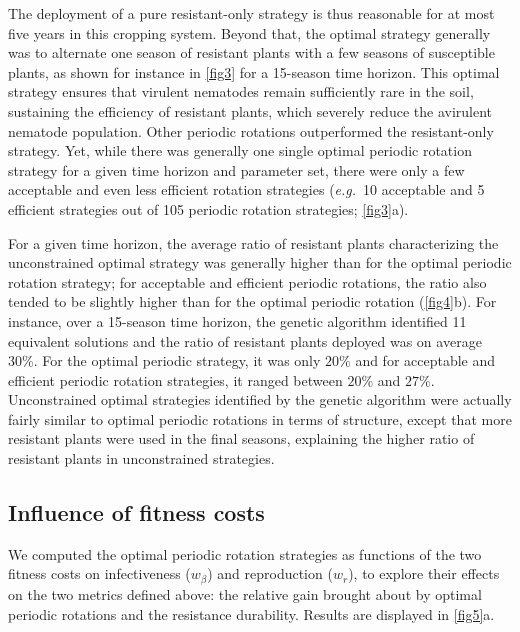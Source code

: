 {{{{The deployment of a pure resistant-only strategy is thus reasonable
for at most five years in this cropping system. Beyond that, the
optimal strategy generally was to alternate one season of resistant
plants with a few seasons of susceptible plants, as shown for instance
in \autoref{fig3} for a 15-season time horizon. This optimal strategy
ensures that virulent nematodes remain sufficiently rare in the soil,
{sustaining} the efficiency of resistant plants, which severely reduce
the avirulent nematode population. Other periodic rotations
outperformed the resistant-only strategy. Yet, while there was
generally one single optimal periodic rotation strategy for a given
time horizon and parameter set, there were only a few acceptable and
even less efficient rotation strategies (\textit{e.g.}~10 acceptable
and 5 efficient strategies out of 105 periodic rotation strategies;
\autoref{fig3}a).


For a given time horizon, the average ratio of resistant plants
{characterizing} the unconstrained optimal strategy {was generally
  higher} than for the optimal periodic rotation strategy; for
acceptable and efficient periodic rotations, the ratio also tended to
be slightly higher than for the optimal periodic rotation
(\autoref{fig4}b).  For instance, over a 15-season time horizon, the
genetic algorithm identified 11 equivalent solutions and the ratio of
resistant plants deployed was on average $30\%$. For the optimal
periodic strategy, it was only $20\%$ and for acceptable and efficient
periodic rotation strategies, it ranged between $20\%$ and
$27\%$. Unconstrained optimal strategies identified by the genetic
algorithm were actually fairly similar to optimal periodic rotations
in terms of structure, except that more resistant plants were used in
the final seasons, explaining the higher ratio of resistant plants in
unconstrained strategies.

\subsection{Influence of fitness costs}

We computed the optimal periodic rotation strategies as functions of
the two fitness costs on infectiveness ($w_{\beta}$) and reproduction
($w_{r}$), to explore their effects on the two metrics defined above:
the relative gain brought about by optimal periodic rotations and the
resistance durability. Results are displayed in \autoref{fig5}a.

}}}}
